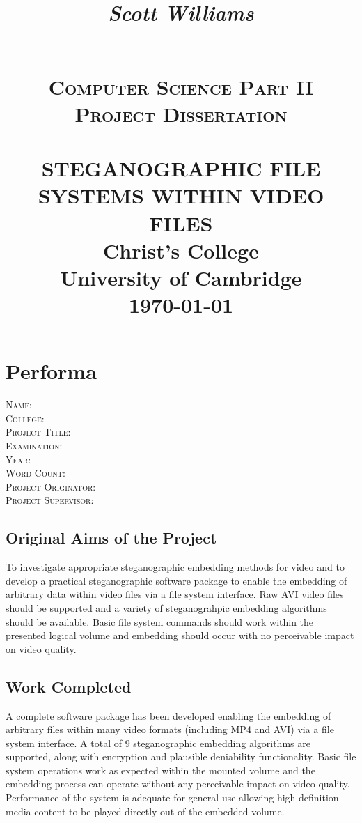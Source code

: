 \documentclass[paper=a4, fontsize=11pt,twoside]{scrartcl}    %
\title{
	\begin{flushright}
		\LARGE{\textit{Scott Williams}}
	\end{flushright}
	~\\[2.0cm]			
	\normalsize \textsc{Computer Science Part II Project Dissertation}\\[2.0cm]     %
    \HRule{0.5pt} \\                        %
    \LARGE \textbf{\uppercase{Steganographic file systems within video files}}    %
    \HRule{2pt} \\[30pt]        %
    \normalsize Christ's College\\[5pt]University of Cambridge\\[25pt]           
    \normalsize \today            %
}
\makeatletter
\numberwithin{table}{section}
\numberwithin{figure}{section}
\def\printtitle{%
    {\centering \@title\par}}
\def\printauthor{%
    {\large \@author}}
\newcommand\blankpage{%
    \null
    \thispagestyle{empty}%
    \addtocounter{page}{-1}%
    \newpage}
\makeatother
\begin{document}
\renewcommand{\thelstlisting}{\thesection.\arabic{lstlisting}}
\thispagestyle{empty}        %

\printtitle                    %
\vfill
\printauthor                %
\afterpage{\blankpage}
\newpage
\setcounter{page}{1}        %
\section*{Performa}
\textsc{Name}: \\
\textsc{College}: \\
\textsc{Project Title}: \\
\textsc{Examination}: \\
\textsc{Year}: \\
\textsc{Word Count}: \\
\textsc{Project Originator}: \\
\textsc{Project Supervisor}: \\

\subsection*{Original Aims of the Project}
To investigate appropriate steganographic embedding methods for video and to develop a practical steganographic software package to enable the embedding of arbitrary data within video files via a file system interface. Raw AVI video files should be supported and a variety of steganograhpic embedding algorithms should be available. Basic file system commands should work within the presented logical volume and embedding should occur with no perceivable impact on video quality.

\subsection*{Work Completed}
A complete software package has been developed enabling the embedding of arbitrary files within many video formats (including MP4 and AVI) via a file system interface. A total of 9 steganographic embedding algorithms are supported, along with encryption and plausible deniability functionality. Basic file system operations work as expected within the mounted volume and the embedding process can operate without any perceivable impact on video quality. Performance of the system is adequate for general use allowing high definition media content to be played directly out of the embedded volume.
\end{document}
